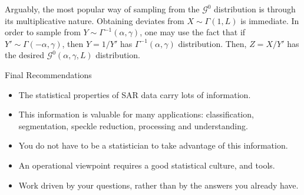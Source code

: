 \documentclass{beamer}
\begin{document}
\begin{frame}[allowframebreaks]
Arguably, the most popular way of sampling from the $\mathcal G^0$ distribution is through its multiplicative nature.
Obtaining deviates from $X\sim\Gamma(1,L)$ is immediate.
In order to sample from $Y\sim\Gamma^{-1}(\alpha,\gamma)$, one may use the fact that if $Y'\sim\Gamma(-\alpha,\gamma)$, then $Y=1/Y'$ has $\Gamma^{-1}(\alpha,\gamma)$ distribution.
Then, $Z=X/Y'$ has the desired $\mathcal G^0(\alpha,\gamma,L)$ distribution.
\end{frame}

\begin{frame}{Final Recommendations}
\begin{itemize}
\item The statistical properties of SAR data carry lots of information.
\item This information is valuable for many applications: classification, segmentation, speckle reduction, processing and understanding.
\item You do not have to be a statistician to take advantage of this information.
\item An operational viewpoint requires a good statistical culture, and tools.
\item Work driven by your questions, rather than by the answers you already have.
\end{itemize}

\end{frame}
\end{document}
